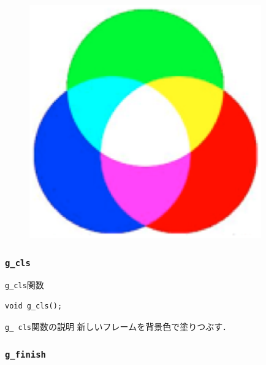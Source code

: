 \documentclass[platex,a4paper,12pt]{jsarticle}%
\begin{document}
\begin{figure}[htb]
\centering
\includegraphics[width=100mm]{Canvas_g_scr_color.eps}
\end{figure}



\subsubsection{\texttt{g\_cls}}

\begin{itembox}[l]{\texttt{g\_cls}関数}
\begin{verbatim}
void g_cls();
\end{verbatim}
\end{itembox}

\begin{itembox}[l]{\texttt{g\_ cls}関数の説明}
	新しいフレームを背景色で塗りつぶす．
\end{itembox}


\clearpage
\subsubsection{\texttt{g\_finish}}
\end{document}
